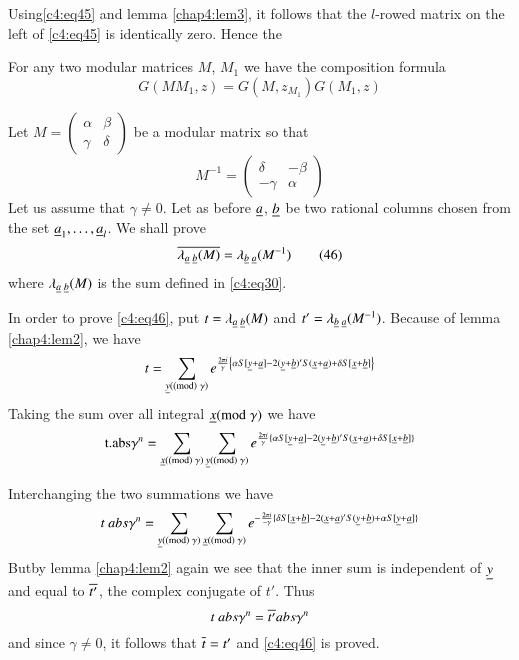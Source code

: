 Using\pageoriginale \eqref{c4:eq45} and lemma \ref{chap4:lem3}, it follows that
the $l$-rowed matrix on the left of \eqref{c4:eq45} is identically
zero. Hence the 

\begin{thm}\label{chap4:thm2}
For any two modular matrices $M$, $M_{1}$ we have the composition
formula
$$
\boxed{G(MM_{1},z)=G(M,z_{M_{1}})G(M_{1},z)}
$$
\end{thm}

Let $M=\left(\begin{smallmatrix} \alpha & \beta\\ \gamma & \delta
\end{smallmatrix}\right)$ be a modular matrix so that
$$
M^{-1}=
\begin{pmatrix}
\delta & -\beta\\
-\gamma & \alpha
\end{pmatrix}
$$
Let us assume that $\gamma\neq 0$. Let as before $\underline{a}$, $\underline{b}$ be
two rational columns chosen from the set
$\underline{a}_{1},\ldots,\underline{a}_{l}$. We shall prove 
\begin{equation*}
\overline{\lambda_{\underline{a} \; \underline{b}}(M)} =
\lambda_{\underline{b} \; \underline{a}}(M^{-1})\tag{46}\label{c4:eq46}   
\end{equation*}
where $\lambda_{\underline{a} \; \underline{b}}(M)$ is the sum defined in \eqref{c4:eq30}.

In order to prove \eqref{c4:eq46}, put $t=\lambda_{\underline{a} \; \underline{b}}(M)$ and
$t'=\lambda_{\underline{b} \; \underline{a}}(M^{-1})$. Because of lemma \ref{chap4:lem2}, we
have
$$
t=\sum_{\underline{y}(\rm(mod) \; \gamma)}e^{\frac{2\pi i}{\gamma}\left\{\alpha
  S[\underline{y}+\underline{a}]-2(\underline{y}+\underline{b})'S(\underline{x}+\underline{a})+\delta
  S[\underline{x}+\underline{b}]\right\}} 
$$
Taking the sum over all integral $\underline{x}(\rm{mod} \; \gamma)$ we have
$$
\text{t.abs}\gamma^{n}=\sum_{\underline{x}(\rm(mod) \; \gamma)}\sum_{\underline{y}(\rm(mod) \; \gamma)}e^{\frac{2\pi
    i}{\gamma}\{\alpha S[\underline{y}+\underline{a}]-2(\underline{y}+\underline{b})'S(\underline{x}+\underline{a})+\delta
  S[\underline{x}+\underline{b}]\}} 
$$

Interchanging the two summations we have
$$
t\ abs
\gamma^{n}=\sum_{\underline{y}(\rm(mod) \; \gamma)}\sum_{\underline{x}(\rm(mod) \; \gamma)}e^{-\frac{2\pi
    i}{-\gamma}\{\delta
  S[\underline{x}+\underline{b}]-2(\underline{x}+\underline{a})'S(\underline{y}+\underline{b})+\alpha
  S[\underline{y}+\underline{a}]\}} 
$$
But\pageoriginale by lemma \ref{chap4:lem2} again we see that the inner sum
is independent of $\underline{y}$ and equal to $\overline{t'}$, the complex
conjugate of $t'$. Thus
$$
t\ abs\gamma^{n}=\ob{t'}abs\gamma^{n}
$$
and since $\gamma\neq 0$, it follows that $\overline{t}=t'$ and \eqref{c4:eq46}
is proved.

